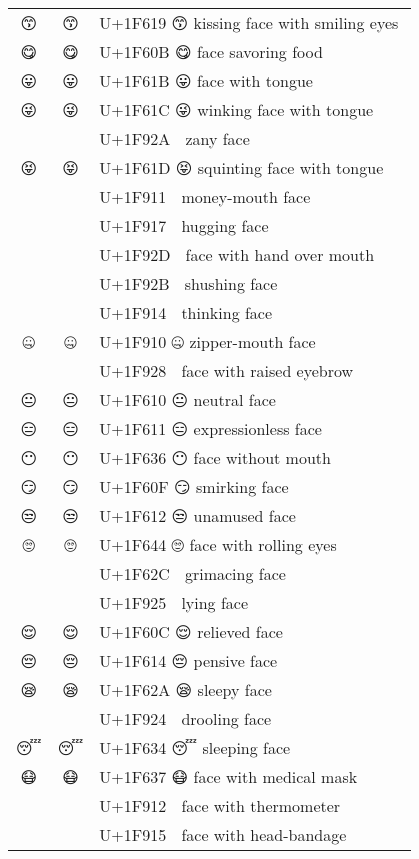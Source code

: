 \documentclass[a4paper,12pt]{ltjarticle}
\newcommand{\fontA}[1]{{\fontspec[RawFeature={mode=harf,+dist,+ccmp}]{Segoe UI Emoji} #1}}
\newcommand{\fontB}[1]{{\fontspec[RawFeature={mode=harf,+dist,+ccmp}]{Noto Color Emoji} #1}}
\begin{document}
\begin{longtable}[c]{ccp{0.8\linewidth}}
\fontA{😙}&\fontB{😙}&U+1F619 😙 kissing face with smiling eyes\\
\fontA{😋}&\fontB{😋}&U+1F60B 😋 face savoring food\\
\fontA{😛}&\fontB{😛}&U+1F61B 😛 face with tongue\\
\fontA{😜}&\fontB{😜}&U+1F61C 😜 winking face with tongue\\
\fontA{🤪}&\fontB{🤪}&U+1F92A 🤪 zany face\\
\fontA{😝}&\fontB{😝}&U+1F61D 😝 squinting face with tongue\\
\fontA{🤑}&\fontB{🤑}&U+1F911 🤑 money-mouth face\\
\fontA{🤗}&\fontB{🤗}&U+1F917 🤗 hugging face\\
\fontA{🤭}&\fontB{🤭}&U+1F92D 🤭 face with hand over mouth\\
\fontA{🤫}&\fontB{🤫}&U+1F92B 🤫 shushing face\\
\fontA{🤔}&\fontB{🤔}&U+1F914 🤔 thinking face\\
\fontA{🤐}&\fontB{🤐}&U+1F910 🤐 zipper-mouth face\\
\fontA{🤨}&\fontB{🤨}&U+1F928 🤨 face with raised eyebrow\\
\fontA{😐}&\fontB{😐}&U+1F610 😐 neutral face\\
\fontA{😑}&\fontB{😑}&U+1F611 😑 expressionless face\\
\fontA{😶}&\fontB{😶}&U+1F636 😶 face without mouth\\
\fontA{😏}&\fontB{😏}&U+1F60F 😏 smirking face\\
\fontA{😒}&\fontB{😒}&U+1F612 😒 unamused face\\
\fontA{🙄}&\fontB{🙄}&U+1F644 🙄 face with rolling eyes\\
\fontA{😬}&\fontB{😬}&U+1F62C 😬 grimacing face\\
\fontA{🤥}&\fontB{🤥}&U+1F925 🤥 lying face\\
\fontA{😌}&\fontB{😌}&U+1F60C 😌 relieved face\\
\fontA{😔}&\fontB{😔}&U+1F614 😔 pensive face\\
\fontA{😪}&\fontB{😪}&U+1F62A 😪 sleepy face\\
\fontA{🤤}&\fontB{🤤}&U+1F924 🤤 drooling face\\
\fontA{😴}&\fontB{😴}&U+1F634 😴 sleeping face\\
\fontA{😷}&\fontB{😷}&U+1F637 😷 face with medical mask\\
\fontA{🤒}&\fontB{🤒}&U+1F912 🤒 face with thermometer\\
\fontA{🤕}&\fontB{🤕}&U+1F915 🤕 face with head-bandage\\

\end{longtable}
\end{document}
